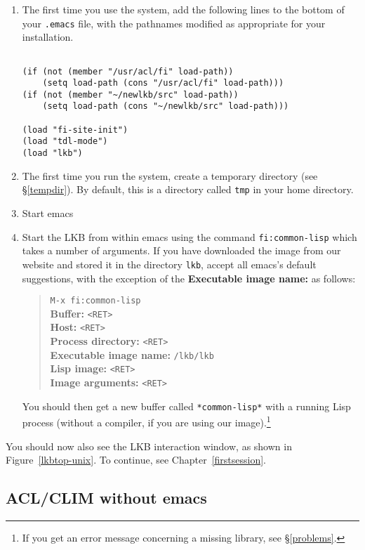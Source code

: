 \documentclass[12pt]{report}
\newcommand{\filename}[1]{{\tt #1}}
\begin{document}
\begin{enumerate}
\item The first time you use the system,
add the following lines to the bottom of your \filename{.emacs}
file, with the pathnames modified as appropriate for your
installation.
\begin{verbatim}

(if (not (member "/usr/acl/fi" load-path))
    (setq load-path (cons "/usr/acl/fi" load-path)))
(if (not (member "~/newlkb/src" load-path))
    (setq load-path (cons "~/newlkb/src" load-path)))
	
(load "fi-site-init")
(load "tdl-mode")
(load "lkb")
\end{verbatim}
\item The first time you run the system,
create a temporary directory (see \S\ref{tempdir}).  By default, this is
a directory called \filename{tmp} in your home directory.
\item Start emacs
\item Start the LKB from within emacs using the 
command \verb+fi:common-lisp+ which takes a number
of arguments.  If you have downloaded the image from our website
and stored it in the directory \filename{lkb}, accept all emacs's default
suggestions, with the exception of the {\bf Executable image name:}
as follows:
\begin{quote}
\verb+M-x fi:common-lisp+\\
{\bf Buffer:} \verb+<RET>+\\
{\bf Host:} \verb+<RET>+\\
{\bf Process directory:} \verb+<RET>+\\
{\bf Executable image name:} \verb+/lkb/lkb+\\
{\bf Lisp image:}  \verb+<RET>+\\
{\bf Image arguments:}  \verb+<RET>+
\end{quote}
You should then get a new buffer called \verb+*common-lisp*+ with
a running Lisp process (without a compiler, if you are using our
image).\footnote{If you get an error message concerning a missing library,
see \S\ref{problems}.}
\end{enumerate}
You
should now also see the LKB interaction window, as shown in 
Figure~\ref{lkbtop-unix}.
To continue, see Chapter~\ref{firstsession}.


\subsection{ACL/CLIM without emacs}
\label{clim-image}
\end{document}
